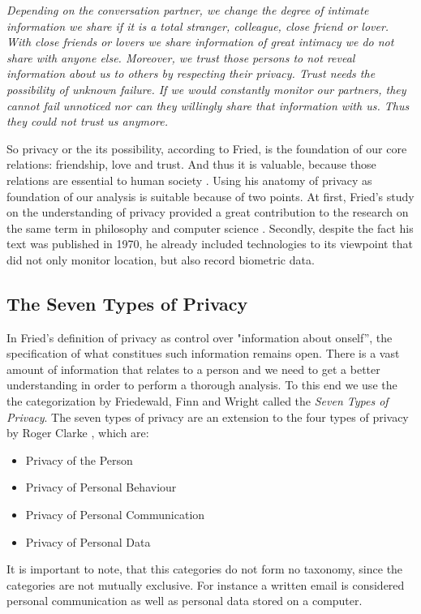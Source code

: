 \documentclass[runningheads,a4paper]{llncs}
\newenvironment{LGContent}
{ \par\color{blue} \it \small }
{ \par }
\begin{document}
\begin{LGContent}
Depending on the conversation partner, we change the degree of intimate information we share if it is a total stranger, colleague, close friend or lover.
With close friends or lovers we share information of great intimacy we do not share with anyone else.
Moreover, we trust those persons to not reveal information about us to others by respecting their privacy.
Trust needs the possibility of unknown failure.
If we would constantly monitor our partners, they cannot fail unnoticed nor can they willingly share that information with us.
Thus they could not trust us anymore. \cite{CFried:Privacy}

So privacy or the its possibility, according to Fried, is the foundation of our core relations: friendship, love and trust.
And thus it is valuable, because those relations are essential to human society \cite{CFried:Privacy}.
Using his anatomy of privacy as foundation of our analysis is suitable because of two points.
At first, Fried's study on the understanding of privacy provided a great contribution to the research on the same term in philosophy \cite{sep-privacy} and computer science \cite{SociotechnicalArchitectureForOnlinePrivacy}.
Secondly, despite the fact his text was published in 1970, he already included technologies to its viewpoint that did not only monitor location, but also record biometric data.

\subsection{The Seven Types of Privacy}\label{sec:privacytypes}

In Fried's definition of privacy as control over "information about onself'', the specification of what constitues such information remains open.
There is a vast amount of information that relates to a person and we need to get a better understanding in order to perform a thorough analysis.
To this end we use the the categorization by Friedewald, Finn and Wright \cite{7ToP} called the \textit{Seven Types of Privacy}.
The seven types of privacy are an extension to the four types of privacy by Roger Clarke \cite{RClarke:4ToP}, which are:
\begin{itemize}
\item Privacy of the Person
\item Privacy of Personal Behaviour
\item Privacy of Personal Communication
\item Privacy of Personal Data
\end{itemize}
It is important to note, that this categories do not form no taxonomy, since the categories are not mutually exclusive.
For instance a written email is considered personal communication as well as personal data stored on a computer.


\end{LGContent}
\end{document}
